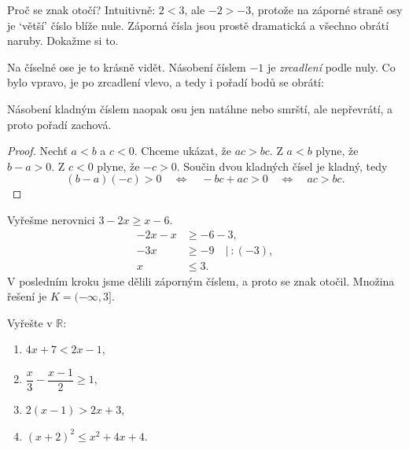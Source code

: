 Proč se znak otočí? Intuitivně: $2 < 3$, ale $-2 > -3$, protože na záporné straně osy je `větší' číslo blíže nule. Záporná čísla jsou prostě dramatická a všechno obrátí naruby. Dokažme si to.

Na číselné ose je to krásně vidět. Násobení číslem $-1$ je \textit{zrcadlení} podle nuly. Co bylo vpravo, je po zrcadlení vlevo, a tedy i pořadí bodů se obrátí:
\begin{center}
\end{center}
Násobení kladným číslem naopak osu jen natáhne nebo smrští, ale nepřevrátí, a proto pořadí zachová.

\begin{proof}
  Nechť $a < b$ a $c < 0$. Chceme ukázat, že $ac > bc$. Z $a < b$ plyne, že $b - a > 0$. Z $c < 0$ plyne, že $-c > 0$. Součin dvou kladných čísel je kladný, tedy
  \begin{equation*}
    (b - a)(-c) > 0\quad\Leftrightarrow\quad -bc + ac > 0\quad\Leftrightarrow\quad ac > bc.
  \end{equation*}
\end{proof}

\begin{example}
  Vyřešme nerovnici $3 - 2x\geq x - 6$.
  \begin{align*}
    -2x - x &\geq -6 - 3,\\
    -3x &\geq -9 \quad\Big|\ :(-3),\\
    x &\leq 3.
  \end{align*}
  V posledním kroku jsme dělili záporným číslem, a proto se znak otočil. Množina řešení je $K = (-\infty, 3]$.
\end{example}

\begin{problem}
  Vyřešte v $\mathbb{R}$:
  \begin{enumerate}[label=(\alph*)]
    \item $4x + 7 < 2x - 1$,
    \item $\dfrac{x}{3} - \dfrac{x - 1}{2}\geq 1$,
    \item $2(x - 1) > 2x + 3$,
    \item $(x + 2)^2\leq x^2 + 4x + 4$.
  \end{enumerate}
\end{problem}

